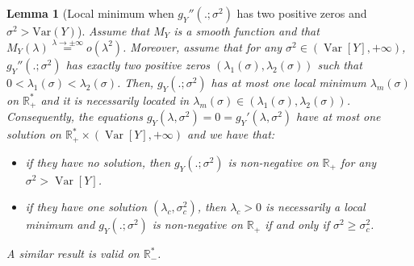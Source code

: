 \documentclass[a4paper, 10pt]{article}
\newtheorem{lemma}{Lemma}[section]
\theoremstyle{definition}
\begin{document}
\begin{lemma}[Local minimum when $g_Y''(.;\sigma^2)$ has two positive zeros and $\sigma^2>\text{Var}(Y)$]
\label{LemmaNumber}
Assume that $M_Y$ is a smooth function and that $M_Y(\lambda)\overset{\lambda\to \pm\infty}{=}o(\lambda^2)$. Moreover, assume that for any $\sigma^2\in \left(\operatorname{Var}[Y],+\infty\right)$, $g_Y''(.;\sigma^2)$ has exactly two positive zeros $(\lambda_1(\sigma),\lambda_2(\sigma))$ such that $0<\lambda_1(\sigma)<\lambda_2(\sigma)$. Then, $g_Y(.;\sigma^2)$ has at most one local minimum  $\lambda_m(\sigma)$ on $\mathbb{R}_+^*$ and it is necessarily located in $\lambda_m(\sigma)\in\left(\lambda_1(\sigma),\lambda_2(\sigma)\right)$. %
Consequently, the equations $g_Y(\lambda,\sigma^2)=0=g_Y'(\lambda,\sigma^2)$ have at most one solution on $\mathbb{R}_+^*\times \left(\operatorname{Var}[Y],+\infty\right)$ and we have that:
\begin{itemize}
    \item if they have no solution, then $g_Y(.;\sigma^2)$ is non-negative on $\mathbb{R}_+$ for any $\sigma^2>\operatorname{Var}[Y]$.
    \item if they have one solution $(\lambda_c,\sigma_c^2)$, then $\lambda_c>0$ is necessarily a local minimum and $g_Y(.;\sigma^2)$ is non-negative on $\mathbb{R}_+$ if and only if $\sigma^2\geq \sigma_c^2$. 
\end{itemize}
A similar result is valid on $\mathbb{R}_-^*$. 
\end{lemma}
\end{document}
